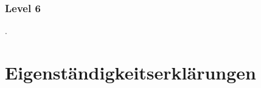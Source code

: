 \documentclass[a4paper 11pt]{article}
\begin{document}
\subsubsection{Level 6}

. 


\normalsize
\newpage

\appendix
\section{Eigenständigkeitserklärungen}


	
\end{document}
